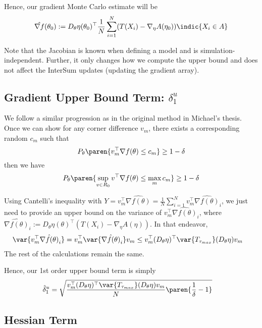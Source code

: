 \documentclass[10pt, a4paper]{article}
\begin{document}
Hence, our gradient Monte Carlo estimate will be
\begin{align*}
    \hat{\nabla f}(\theta_0)
    :=
    D_{\theta} \eta(\theta_0)^\top 
    \frac{1}{N}
    \sum\limits_{i=1}^N
    (T(X_i)-\nabla_\eta A(\eta_0)) \indic{X_i \in A}
\end{align*}

Note that the Jacobian is known when defining a model
and is simulation-independent.
Further, it only changes how we compute the upper bound
and does not affect the InterSum updates (updating the gradient array).

\subsection*{Gradient Upper Bound Term: $\delta_1^u$}

We follow a similar progression as in the original method in Michael's thesis.
Once we can show for any corner difference $v_m$, 
there exists a corresponding random $c_m$ such that
\[
    P_\theta\paren{v_m^\top \nabla f(\theta) \leq c_m} \geq 1-\delta
\]
then we have
\[
    P_\theta\paren{\sup\limits_{v\in R_0} v^\top \nabla f(\theta) \leq \max\limits_{m} c_m} \geq 1-\delta
\]

Using Cantelli's inequality
with $Y = v_m^\top \hat{\nabla f(\theta)} = \frac{1}{N} \sum\limits_{i=1}^N v_m^\top \hat{\nabla f(\theta)}_i$,
we just need to provide an upper bound on the variance of $v_m^\top \hat{\nabla f(\theta)}_i$,
where $\hat{\nabla f(\theta)}_i := D_\theta \eta(\theta)^\top (T(X_i)-\nabla_\eta A(\eta))$.
In that endeavor,
\begin{align*}
    \var{v_m^\top \hat{\nabla f(\theta)}_i}
    &=
    v_m^\top \var{\hat{\nabla f(\theta)}_i} v_m
    \leq 
    v_m^\top (D_\theta \eta)^\top \var{T_{\tau_{max}}} (D_\theta \eta) v_m
\end{align*}
The rest of the calculations remain the same.

Hence, our 1st order upper bound term is simply
\begin{align*}
    \hat{\delta}_1^u
    &=
    \sqrt{
        \frac{v_m^\top (D_\theta \eta)^\top \var{T_{\tau_{max}}} (D_\theta \eta) v_m}{N}
        \paren{\frac{1}{\delta} - 1}
    }
\end{align*}

\subsection*{Hessian Term}
\end{document}
